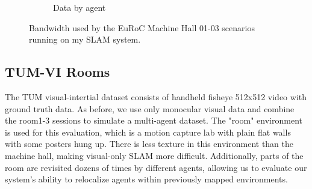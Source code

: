 \begin{figure}[h]
\begin{subfigure}[b]{0.45\linewidth}
        \caption{Data by agent}
    \end{subfigure}%

    \caption{Bandwidth used by the EuRoC Machine Hall 01-03 scenarios running on my SLAM system.}
    \label{fig:euroc-mh-01-02-bandwith}
\end{figure}

\subsection{TUM-VI Rooms}
\label{sec:tum-rooms}
The TUM visual-intertial dataset \autocite{8593419} consists of handheld fisheye 512x512 video with ground truth data. As before, we use only monocular visual data and combine the room1-3 sessions to simulate a multi-agent dataset. The "room" environment is used for this evaluation, which is a motion capture lab with plain flat walls with some posters hung up. There is less texture in this environment than the machine hall, making visual-only SLAM more difficult. Additionally, parts of the room are revisited dozens of times by different agents, allowing us to evaluate our system's ability to relocalize agents within previously mapped environments.

